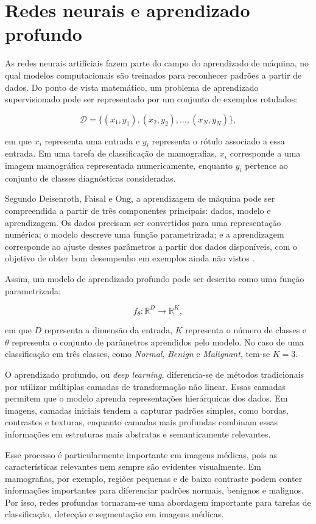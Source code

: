 \documentclass[
    12pt,
    openright,
    oneside,
    a4paper,
    english,
    brazil
]{abntex2}
\begin{document}
\section{Redes neurais e aprendizado profundo}

As redes neurais artificiais fazem parte do campo do aprendizado de máquina, no qual modelos computacionais são treinados para reconhecer padrões a partir de dados. Do ponto de vista matemático, um problema de aprendizado supervisionado pode ser representado por um conjunto de exemplos rotulados:

\[
\mathcal{D} = \{(x_1,y_1),(x_2,y_2),\ldots,(x_N,y_N)\},
\]

em que \(x_i\) representa uma entrada e \(y_i\) representa o rótulo associado a essa entrada. Em uma tarefa de classificação de mamografias, \(x_i\) corresponde a uma imagem mamográfica representada numericamente, enquanto \(y_i\) pertence ao conjunto de classes diagnósticas consideradas.

Segundo Deisenroth, Faisal e Ong, a aprendizagem de máquina pode ser compreendida a partir de três componentes principais: dados, modelo e aprendizagem. Os dados precisam ser convertidos para uma representação numérica; o modelo descreve uma função parametrizada; e a aprendizagem corresponde ao ajuste desses parâmetros a partir dos dados disponíveis, com o objetivo de obter bom desempenho em exemplos ainda não vistos \cite{deisenroth2020mathematics}.

Assim, um modelo de aprendizado profundo pode ser descrito como uma função parametrizada:

\[
f_{\theta}: \mathbb{R}^{D} \rightarrow \mathbb{R}^{K},
\]

em que \(D\) representa a dimensão da entrada, \(K\) representa o número de classes e \(\theta\) representa o conjunto de parâmetros aprendidos pelo modelo. No caso de uma classificação em três classes, como \textit{Normal}, \textit{Benign} e \textit{Malignant}, tem-se \(K=3\).

O aprendizado profundo, ou \textit{deep learning}, diferencia-se de métodos tradicionais por utilizar múltiplas camadas de transformação não linear. Essas camadas permitem que o modelo aprenda representações hierárquicas dos dados. Em imagens, camadas iniciais tendem a capturar padrões simples, como bordas, contrastes e texturas, enquanto camadas mais profundas combinam essas informações em estruturas mais abstratas e semanticamente relevantes.

Esse processo é particularmente importante em imagens médicas, pois as características relevantes nem sempre são evidentes visualmente. Em mamografias, por exemplo, regiões pequenas e de baixo contraste podem conter informações importantes para diferenciar padrões normais, benignos e malignos. Por isso, redes profundas tornaram-se uma abordagem importante para tarefas de classificação, detecção e segmentação em imagens médicas.
\end{document}

